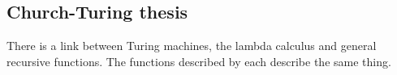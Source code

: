 
\subsection{Church-Turing thesis}


There is a link between Turing machines, the lambda calculus and general recursive functions. The functions described by each describe the same thing.

